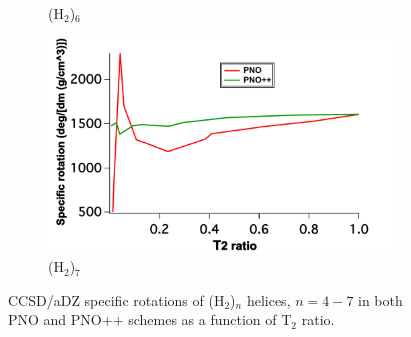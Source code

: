 \begin{figure}
\begin{subfigure}{.5\textwidth}
  \caption{(H$_2$)$_6$}
  \label{fig:sfig2}
\end{subfigure}
\begin{subfigure}{.5\textwidth}
  \centering
  \includegraphics[width=.9\linewidth]{figures_pno++/pno++_h2_7_adz_optrot_lg.pdf}
  \caption{(H$_2$)$_7$}
  \label{fig:sfig2}
\end{subfigure}
\caption{{\footnotesize CCSD/aDZ  specific rotations of
(H$_2$)$_n$ helices, $ n = 4-7$ in both PNO and PNO++ schemes as a function of
T$_2$ ratio.}}
\label{fig:pno++_optrot_h2_n}
\end{figure}
